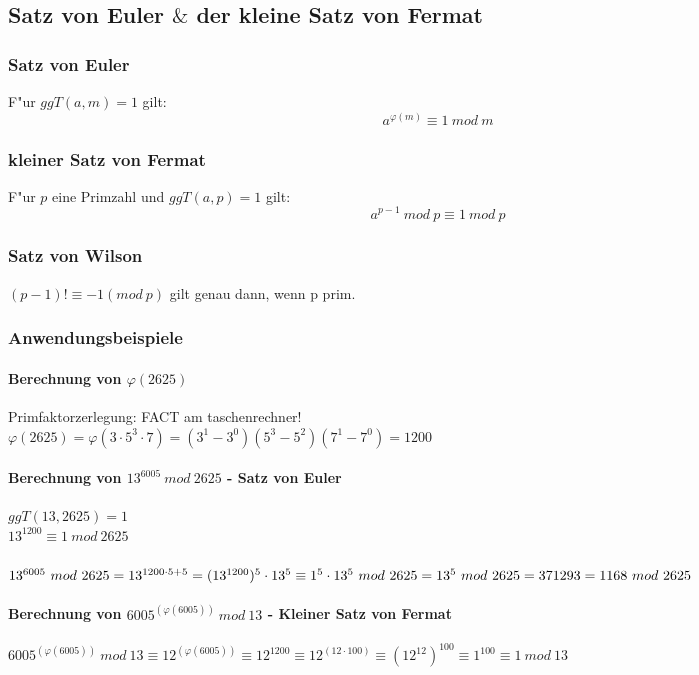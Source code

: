 \documentclass[10pt,a4paper,landscape]{article}
\begin{document}
\begin{multicols*}{3}
		\subsection{Satz von Euler $\&$ der kleine Satz von Fermat}
		\subsubsection{Satz von Euler}
		F"ur $ggT(a, m) = 1$ gilt:
		\[
		a^{\varphi(m)} \equiv 1~mod~m
		\]
		\subsubsection{kleiner Satz von Fermat}
		F"ur $p$ eine Primzahl und $ggT(a, p) = 1$ gilt:
		\[
		a^{p-1}~mod~p \equiv 1~mod~p
		\]
		\subsubsection{Satz von Wilson}
		$(p-1)! \equiv -1(mod~p)$ gilt genau dann, wenn p prim.
		
		\subsubsection{Anwendungsbeispiele}
		\paragraph{Berechnung von $\varphi(2625)$}
		Primfaktorzerlegung: FACT am taschenrechner!\\
		$\varphi(2625) = \varphi(3 \cdot 5^3 \cdot 7) = (3^1-3^0)(5^3-5^2)(7^1-7^0) = 1200$ 
		\paragraph{Berechnung von $13^{6005}~mod~2625$ - Satz von Euler}
		\begin{onehalfspacing}
			$ggT(13, 2625) = 1$\\
			$13^{1200} \equiv 1~mod~2625$\\
			\\
			$13^{6005}~mod~2625 = 13^{1200 \cdot 5 + 5} = (13^{1200})^5 \cdot 13^{5} \equiv \\
			1^5 \cdot 13^5~mod~2625 = 13^5~mod~2625 = 371293 = 1168~mod~2625$
		\end{onehalfspacing}
		\paragraph{Berechnung von $6005^{(\varphi(6005))}~mod~13$ - Kleiner Satz von Fermat}
		\begin{onehalfspacing}
			$6005^{(\varphi(6005))}~mod~13 \equiv 12^{(\varphi(6005))} \equiv 12^{1200} \equiv 12^{(12 \cdot 100)} \equiv (12^{12})^{100} \equiv 1^{100} \equiv 1~mod~13$
		\end{onehalfspacing}

\end{multicols*}
\end{document}
